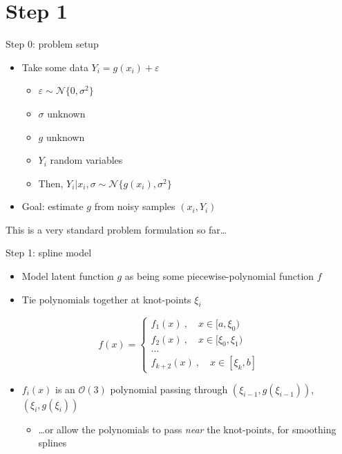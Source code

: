 \documentclass[presentation]{beamer}
\begin{document}
\section{Step 1}
\label{sec:orgeee4aa6}
\begin{frame}[label={sec:org504d860}]{Step 0: problem setup}
\begin{itemize}
\item Take some data \(Y_i = g(x_i) + \varepsilon\)
\begin{itemize}
\item \(\varepsilon\sim\mathcal{N}\{0, \sigma^2\}\)
\item \(\sigma\) unknown
\item \(g\) unknown
\item \(Y_i\) random variables
\item Then, \(Y_i|x_i, \sigma\sim\mathcal{N}\{g(x_i), \sigma^2\}\)
\end{itemize}
\end{itemize}
\vfill
\begin{itemize}
\item Goal: estimate \(g\) from noisy samples \((x_i, Y_i)\)
\end{itemize}
\vfill
This is a very standard problem formulation so far\ldots{}
\end{frame}

\begin{frame}[label={sec:org9e3251e}]{Step 1: spline model}
\begin{itemize}
\item Model latent function \(g\) as being some piecewise-polynomial function \(f\)
\item Tie polynomials together at knot-points \(\xi_i\)
\end{itemize}

\begin{equation}
f(x) = 
    \begin{cases}
        f_1(x)~, \quad x\in[a,\xi_0)\\
	f_2(x)~, \quad x\in[\xi_0, \xi_1)\\
	\dots \\
	f_{k+2}(x)~,\quad x\in[\xi_k, b]
    \end{cases}
\end{equation}

\begin{itemize}
\item \(f_i(x)\) is an \(\mathcal{O}(3)\) polynomial passing through \((\xi_{i-1},g(\xi_{i-1}))\), \((\xi_i, g(\xi_i))\)
\begin{itemize}
\item \ldots{}or allow the polynomials to pass \emph{near} the knot-points, for smoothing splines
\end{itemize}
\end{itemize}
\end{frame}
\end{document}
